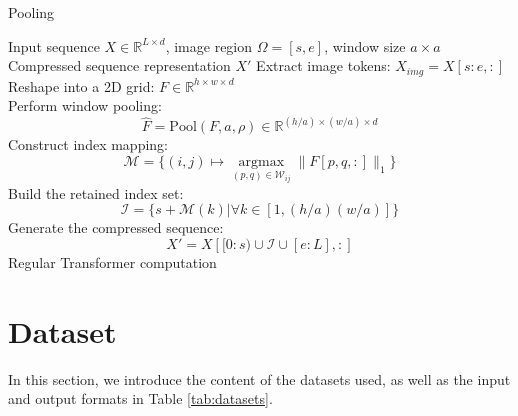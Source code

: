 \begin{algorithm}[t]
\caption{Pooling}
\label{alg:pooling}
\begin{algorithmic}[1]
\Require Input sequence $X \in \mathbb{R}^{L \times d}$, image region $\Omega=[s,e]$, window size $a \times a$%
\Ensure Compressed sequence representation $X'$
        \State Extract image tokens: $X_{img} = X[s:e,:]$
        \State Reshape into a 2D grid: $F \in \mathbb{R}^{h \times w \times d}$ \\
        \State Perform window pooling:
        $$
        \hat{F} = \text{Pool}(F, a, \rho) \in \mathbb{R}^{(h/a) \times (w/a) \times d}
        $$
        \State Construct index mapping:
        $$
        \mathcal{M} = \{(i,j) \mapsto \mathop{\text{argmax}}\limits_{(p,q) \in \mathcal{W}_{ij}} \|F[p,q,:]\|_1\}
        $$
        \State Build the retained index set:
        $$ \mathcal{I} = \{s + \mathcal{M}(k) | \forall k \in [1, (h/a)(w/a)]\} $$
        \State Generate the compressed sequence:
        $$
        X' = X\left[[0:s) \cup \mathcal{I} \cup [e:L], :\right]
        $$
    \Else
        \State Regular Transformer computation
    \EndIf
\EndFor
\end{algorithmic}
\end{algorithm}







\section{Dataset}\label{app:dataset details}


In this section, we introduce the content of the datasets used, as well as the input and output formats in Table \ref{tab:datasets}.

